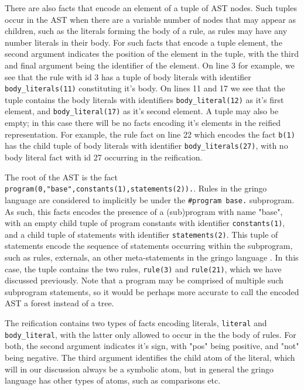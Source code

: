 There are also facts that encode an element of a tuple of AST
nodes. Such tuples occur in the AST when there are a variable number
of nodes that may appear as children, such as the literals forming the
body of a rule, as rules may have any number literals in their
body. For such facts that encode a tuple element, the second argument
indicates the position of the element in the tuple, with the third and
final argument being the identifier of the element. On line 3 for
example, we see that the rule with id 3 has a tuple of body literals
with identifier \texttt{body\_literals(11)} constituting it's body. On
lines 11 and 17 we see that the tuple contains the body literals with
identifiers \texttt{body\_literal(12)} as it's first element, and
\texttt{body\_literal(17)} as it's second element.  A tuple may also be
empty; in this case there will be no facts encoding it's elements in
the reified representation. For example, the rule fact on line 22
which encodes the fact \texttt{b(1)} has the child tuple of body
literals with identifier \texttt{body\_literals(27)}, with no body
literal fact with id 27 occurring in the reification.

The root of the AST is the fact
\texttt{program(0,"base",constants(1),statements(2)).}. Rules in the
gringo language are considered to implicitly be under the
\texttt{\#program base.} subprogram\cite{karoscwa21a}. As such, this
facts encodes the presence of a (sub)program with name "base", with an
empty child tuple of program constants with identifier
\texttt{constants(1)}, and a child tuple of statements with identifier
\texttt{statements(2)}. This tuple of statements encode the sequence
of statements occurring within the subprogram, such as rules,
externals, an other meta-statements in the gringo language
\cite{PotasscoUserGuide19}. In this case, the tuple contains the two
rules, \texttt{rule(3)} and \texttt{rule(21)}, which we have discussed
previously. Note that a program may be comprised of multiple such
subprogram statements, so it would be perhaps more accurate to call
the encoded AST a forest instead of a tree.

The reification contains two types of facts encoding literals,
\texttt{literal} and \texttt{body\_literal}, with the latter only allowed
to occur in the the body of rules. For both, the second argument
indicates it's sign, with "pos" being positive, and "not" being
negative. The third argument identifies the child atom of the literal,
which will in our discussion always be a symbolic atom, but in general
the gringo language has other types of atoms, such as comparisons etc.

